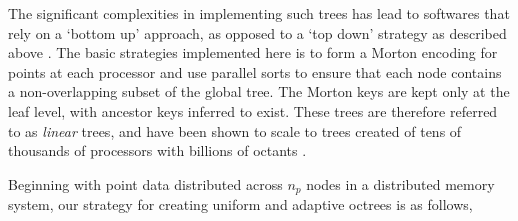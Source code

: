 The significant complexities in implementing such trees has lead to softwares that rely on a `bottom up' approach, as opposed to a `top down' strategy as described above \cite{sampath2008dendro,BursteddeWilcoxGhattas11}. The basic strategies implemented here is to form a Morton encoding for points at each processor and use parallel sorts to ensure that each node contains a non-overlapping subset of the global tree. The Morton keys are kept only at the leaf level, with ancestor keys inferred to exist. These trees are therefore referred to as \textit{linear} trees, and have been shown to scale to trees created of tens of thousands of processors with billions of octants \cite{BursteddeWilcoxGhattas11}.

Beginning with point data distributed across $n_p$ nodes in a distributed memory system, our strategy for creating uniform and adaptive octrees is as follows,

